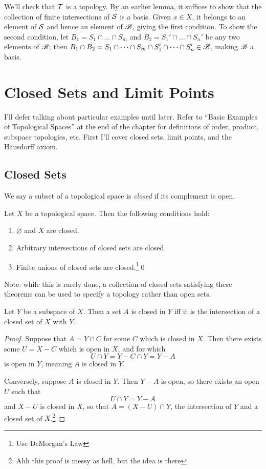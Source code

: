 \documentclass[10pt]{report}
\begin{document}
  We'll check that $\mathcal{T}$ is a topology.
  By an earlier lemma, it suffices to show that the collection of finite intersections of $\mathcal{S}$ is a basis.
  Given $x \in X$, it belongs to an element of $\mathcal{S}$ and hence an element of $\mathscr{B}$, giving the first condition.
  To show the second condition, let $B_1 = S_1 \cap \dots \cap S_m$ and $B_2 = S_1' \cap \dots \cap S_n'$ be any two elements of $\mathscr{B}$; then $B_1 \cap B_2 = S_1 \cap \dots \cap S_m \cap S_1' \cap \dots \cap S_n' \in \mathscr{B}$, making $\mathscr{B}$ a basis.
 

\section{Closed Sets and Limit Points}
I'll defer talking about particular examples until later.
Refer to ``Basic Examples of Topological Spaces'' at the end of the chapter for definitions of order, product, subspace topologies, etc.
First I'll cover closed sets, limit points, and the Hausdorff axiom.

\subsection{Closed Sets}
We say a subset of a topological space is \emph{closed} if its complement is open.
\begin{theorem}
  Let $X$ be a topological space.
  Then the following conditions hold:
  \begin{enumerate}[label={(\arabic*)}]
    \item $\varnothing$ and $X$ are closed.
    \item Arbitrary intersections of closed sets are closed.
    \item Finite unions of closed sets are closed.\footnote{Use DeMorgan's Law}\qed
  \end{enumerate}
\end{theorem}

Note: while this is rarely done, a collection of closed sets satisfying these theorems can be used to specify a topology rather than open sets.

\begin{theorem}
  Let $Y$ be a subspace of $X$.
  Then a set $A$ is closed in $Y$ iff it is the intersection of a closed set of $X$ with $Y$.
\end{theorem}
\begin{proof}
  Suppose that $A = Y \cap C$ for some $C$ which is closed in $X$.
  Then there exists some $U = X - C$ which is open in $X$, and for which
  \[
    U \cap Y = Y - C \cap Y = Y - A
  \]
  is open in $Y$, meaning $A$ is closed in $Y$.
  
  Conversely, suppose $A$ is closed in $Y$.
  Then $Y - A$ is open, so there exists an open $U$ such that
  \[
    U \cap Y = Y - A
  \]
  and $X - U$ is closed in $X$, so that $A = (X - U) \cap Y$, the intersection of $Y$ and a closed set of $X$.\footnote{Ahh this proof is messy as hell, but the idea is there}
\end{proof}
\end{document}
